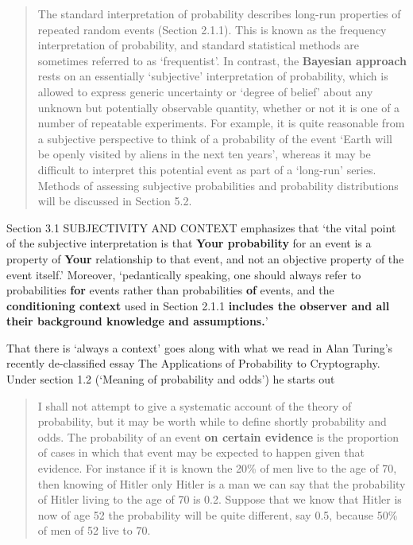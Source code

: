 \documentclass[]{book}
\begin{document}
\begin{quote}
The standard interpretation of probability describes long-run properties of repeated random events (Section 2.1.1). This is known as the frequency interpretation of probability, and standard statistical methods are sometimes referred to as `frequentist'. In contrast, the \textbf{Bayesian approach} rests on an essentially `subjective' interpretation of probability, which is allowed to express generic uncertainty or `degree of belief' about any unknown but potentially observable quantity, whether or not it is one of a number of repeatable experiments. For example, it is quite reasonable from a subjective perspective to think of a probability of the event `Earth will be openly visited by aliens in the next ten years', whereas it may be difficult to interpret this potential event as part of a `long-run' series. Methods of assessing subjective probabilities and probability distributions will be discussed in Section 5.2.
\end{quote}

Section 3.1 SUBJECTIVITY AND CONTEXT emphasizes that
`the vital point of the subjective interpretation is that \textbf{Your probability} for an event is a property of \textbf{Your} relationship to that event, and not an objective property of the event itself.' Moreover, `pedantically speaking, one should always refer to probabilities \textbf{for} events rather than probabilities \textbf{of} events, and the \textbf{conditioning context} used in Section 2.1.1 \textbf{includes the observer and all their background knowledge and assumptions.}'

That there is `always a context' goes along with what we read in Alan Turing's recently de-classified essay The Applications of Probability to Cryptography. Under section 1.2 (`Meaning of probability and odds') he starts out

\begin{quote}
I shall not attempt to give a systematic account of the theory of probability, but it may be worth while to define shortly probability and odds. The probability of an event \textbf{on certain evidence} is the proportion of cases in which that event may be expected to happen given that evidence. For instance if it is known the 20\% of men live to the age of 70, then knowing of Hitler only Hitler is a man we can say that the probability of Hitler living to the age of 70 is 0.2. Suppose that we know that Hitler is now of age 52 the probability will be quite different, say 0.5, because 50\% of men of 52 live to 70.
\end{quote}
\end{document}
